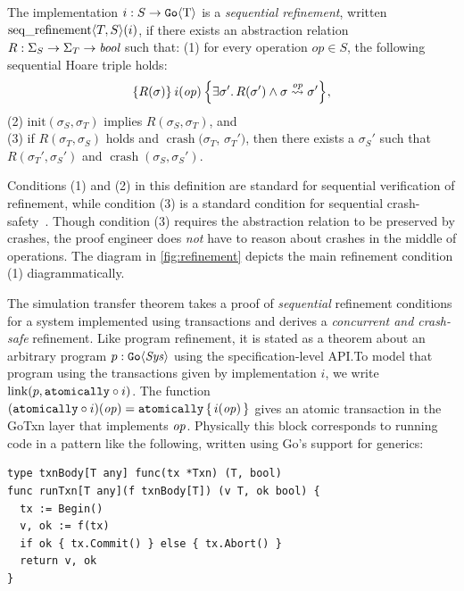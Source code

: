 \begin{definition}
  The implementation $i : S \to \mathtt{Go}\langle \mathrm{T} \rangle$ is a \emph{sequential
    refinement}, written
  $\operatorname{seq\_refinement} \langle T, S \rangle(i)$, if there exists an abstraction relation
  $R : \Sigma_{S} \to \Sigma_{T} \to \textit{bool}$ such that: \newline
(1) for every operation
  $op \in S$, the following sequential Hoare triple holds:
  \[
    \hoare{R(\sigma)}{i(\opv)}{\exists \sigma'.\, R(\sigma') \land \sigma \overset{\opv}{\leadsto} \sigma'},
  \]
(2) $\mathrm{init}(\sigma_{S}, \sigma_{T})$ implies
$R(\sigma_{S}, \sigma_{T})$, and \\
(3) if $R(\sigma_{T}, \sigma_{S})$ holds and $\operatorname{crash}(\sigma_{T}$, $\sigma_{T}')$,
then there exists a $\sigma_{S}'$ such that $R(\sigma_{T}', \sigma_{S}')$ and
$\operatorname{crash}(\sigma_{S}, \sigma_{S}')$.%
  \label{def:seqrefinement}
\end{definition}
%
Conditions (1) and (2) in this definition are standard for sequential
verification of refinement, while condition (3) is a standard condition for sequential crash-safety~\citep{chajed:argosy}. Though condition (3) requires the
abstraction relation to be preserved by crashes, the proof engineer does \emph{not} have to reason about crashes in the middle of operations.
The
diagram in \cref{fig:refinement} depicts the main
refinement condition (1) diagrammatically.

The simulation transfer theorem takes a proof of \emph{sequential} refinement
conditions for a system implemented using transactions and derives a
\emph{concurrent and crash-safe} refinement. Like program refinement, it is
stated as a theorem about an arbitrary program $p : \mathtt{Go}\langle \mathit{Sys} \rangle$ using
the specification-level API.\@ To model that program using the transactions given
by implementation $i$, we write $\mathrm{link}(p, \mathtt{atomically}\circ i)$. The function
$(\mathtt{atomically}\circ i)(\mathit{op}) = \mathtt{atomically}\,\{\, i(\mathit{op}) \,\}$ gives an atomic transaction in
the GoTxn layer that implements $\mathit{op}$. Physically this  block
corresponds to running code in a pattern like the following, written using Go's
support for generics:
%
\begin{verbatim}
type txnBody[T any] func(tx *Txn) (T, bool)
func runTxn[T any](f txnBody[T]) (v T, ok bool) {
  tx := Begin()
  v, ok := f(tx)
  if ok { tx.Commit() } else { tx.Abort() }
  return v, ok
}
\end{verbatim}

